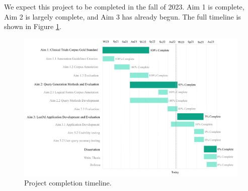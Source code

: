 \documentclass[../main.tex]{subfiles}
\begin{document}
We expect this project to be completed in the fall of 2023. Aim 1 is complete, Aim 2 is largely complete, and Aim 3 has already begun. The full timeline is shown in Figure \ref{timeline}.

\begin{figure}[h!]
  \includegraphics[scale=0.66]{Figures/timeline.pdf} 
\caption{Project completion timeline.}
\label{timeline}
\end{figure}
\end{document}
